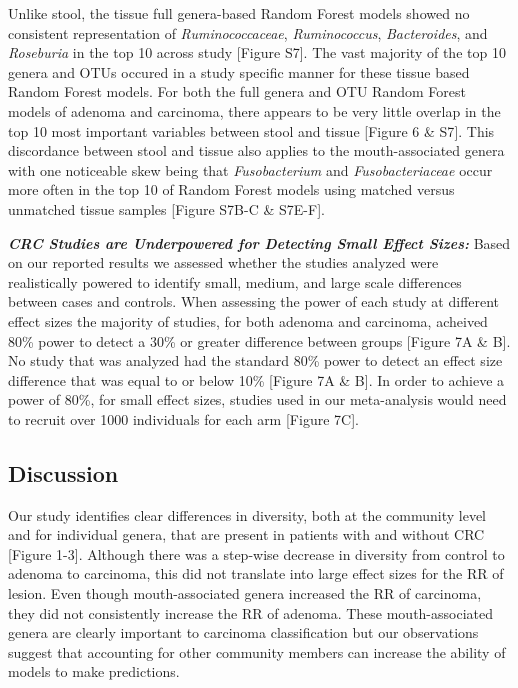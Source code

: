 \documentclass[12pt,]{article}
\begin{document}
Unlike stool, the tissue full genera-based Random Forest models showed
no consistent representation of \emph{Ruminococcaceae},
\emph{Ruminococcus}, \emph{Bacteroides}, and \emph{Roseburia} in the top
10 across study {[}Figure S7{]}. The vast majority of the top 10 genera
and OTUs occured in a study specific manner for these tissue based
Random Forest models. For both the full genera and OTU Random Forest
models of adenoma and carcinoma, there appears to be very little overlap
in the top 10 most important variables between stool and tissue
{[}Figure 6 \& S7{]}. This discordance between stool and tissue also
applies to the mouth-associated genera with one noticeable skew being
that \emph{Fusobacterium} and \emph{Fusobacteriaceae} occur more often
in the top 10 of Random Forest models using matched versus unmatched
tissue samples {[}Figure S7B-C \& S7E-F{]}.

\textbf{\emph{CRC Studies are Underpowered for Detecting Small Effect
Sizes:}} Based on our reported results we assessed whether the studies
analyzed were realistically powered to identify small, medium, and large
scale differences between cases and controls. When assessing the power
of each study at different effect sizes the majority of studies, for
both adenoma and carcinoma, acheived 80\% power to detect a 30\% or
greater difference between groups {[}Figure 7A \& B{]}. No study that
was analyzed had the standard 80\% power to detect an effect size
difference that was equal to or below 10\% {[}Figure 7A \& B{]}. In
order to achieve a power of 80\%, for small effect sizes, studies used
in our meta-analysis would need to recruit over 1000 individuals for
each arm {[}Figure 7C{]}.

\newpage

\subsection{Discussion}\label{discussion}

Our study identifies clear differences in diversity, both at the
community level and for individual genera, that are present in patients
with and without CRC {[}Figure 1-3{]}. Although there was a step-wise
decrease in diversity from control to adenoma to carcinoma, this did not
translate into large effect sizes for the RR of lesion. Even though
mouth-associated genera increased the RR of carcinoma, they did not
consistently increase the RR of adenoma. These mouth-associated genera
are clearly important to carcinoma classification but our observations
suggest that accounting for other community members can increase the
ability of models to make predictions.
\end{document}
